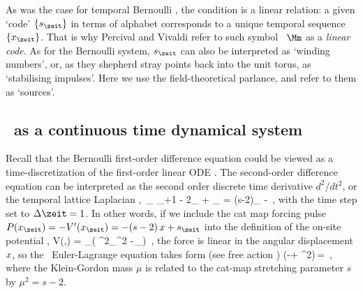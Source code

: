 As was the case for {temporal Bernoulli} , the condition
 is a linear relation: a given `code'
$\{\Ssym{\zeit}\}$ in terms of alphabet  corresponds
to a unique temporal sequence $\{\ssp_\zeit\}$. That is why Percival and
Vivaldi refer to such symbol \brick\ $\Mm$ as a {\em linear
code}. As for the Bernoulli system, $\Ssym{\zeit}$ can also be
interpreted as `winding numbers', or, as they shepherd
stray points back into the unit torus, as `stabilising
impulses'. Here we use the field-theoretical parlance,
and refer to them  as `sources'.

                               \toCB

\subsection{\tempLatt\ as a continuous time dynamical system}
\label{s:tempCatODE}

Recall that the Bernoulli first-order difference equation could be viewed as
a time-discretization of the first-order linear ODE . The
second-order difference equation  can be interpreted as the
second order discrete time derivative ${d^2}/{dt^2}$, or the temporal
lattice Laplacian ,
\beq
\Box\,\ssp_\zeit \equiv
\ssp_{\zeit+1} - 2\ssp_{\zeit} + \ssp_{}
= (s-2)\ssp_{\zeit} -\Ssym{\zeit}
\,,
 with the time step set to $\Delta\zeit=1$.
In other words, if we include the cat map forcing pulse
\(
P(\ssp_\zeit)= - V'(\ssp_\zeit) = - (s-2)\,\ssp + \Ssym{\zeit}
\)
into the definition of
the on-site potential ,
\beq
V(\Xx,\Mm) = \sum_{\zeit\in\lattice}\left(
\mu^2\ssp_\zeit^2 -\Ssym{\zeit}\,\ssp_\zeit\right)
\,,
the force
is linear in the angular displacement $x$, so
the \templatt\ Euler-Lagrange equation takes form (see free action
)
\beq
(-\Box + {\mu}^2\id)\,\Xx = \Mm
\,,
where the Klein-Gordon mass ${\mu}$ is related to the cat-map
stretching parameter ${s}$ by ${\mu}^2={s}-2$.

